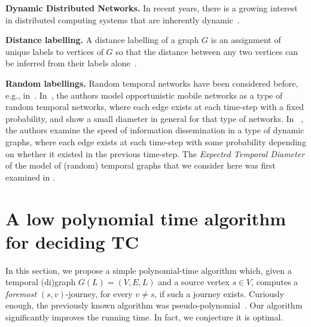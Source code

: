 \documentclass[a4paper,UKenglish]{article}
\begin{document}
\noindent \textbf{Dynamic Distributed Networks.} In recent years, there is a growing interest in distributed computing systems that are inherently dynamic~\cite{angluin, avin, casteigts, clementi, dutta, kuhn, spirakisb, spirakisc, o'dell, sch}.

\noindent \textbf{Distance labelling.} A distance labelling of a graph $G$ is an assignment of unique labels to vertices of $G$ so that the distance between any two vertices can be inferred from their labels alone~\cite{gavoille, katz}.

\noindent \textbf{Random labellings.} Random temporal networks have been considered before, e.g., in~\cite{chaintreau,clementi,akrida}. In~\cite{chaintreau}, the authors model opportunistic mobile networks as a type of random temporal networks, where each edge exists at each time-step with a fixed probability, and show a small diameter in general for that type of networks. In ~\cite{clementi}, the authors examine the speed of information dissemination in a type of dynamic graphs, where each edge exists at each time-step with some probability depending on whether it existed in the previous time-step. The \emph{Expected Temporal Diameter} of the model of (random) temporal graphs that we consider here was first examined in \cite{akrida}. 





\section{A low polynomial time algorithm for deciding TC
}\label{sec:foremost}
In this section, we propose a simple polynomial-time algorithm which, given a temporal (di)graph $G(L)=(V,E,L)$ and a source vertex $s \in V$, computes a \emph{foremost} $(s,v)$-journey, for every $v \not= s$, if such a journey exists. Curiously enough, the previously known algorithm was pseudo-polynomial~\cite{spirakis}. Our algorithm significantly improves the running time. In fact, we conjecture it is optimal.
\end{document}
